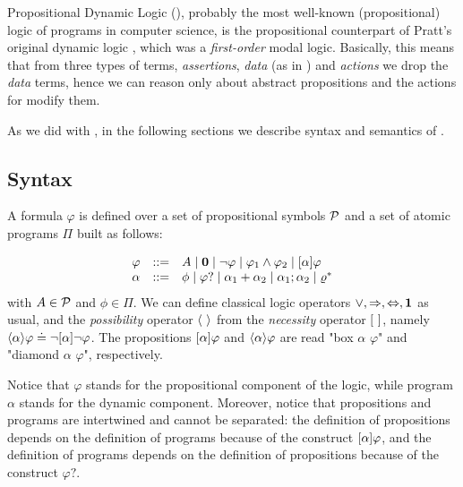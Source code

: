 Propositional Dynamic Logic \citep{FISCHER1979194} (\PDL), probably the most well-known (propositional) logic of programs in computer science, is the propositional counterpart of Pratt's original dynamic logic \citep{Pratt:1976:SCF:889769}, which was a \emph{first-order} modal logic. Basically, this means that from three types of terms, \emph{assertions}, \emph{data} (as in \FOL) and \emph{actions} we drop the \emph{data} terms, hence we can reason only about abstract propositions and the actions for modify them.
 
As we did with \LTL, in the following sections we describe syntax and semantics of \PDL.
\subsection{Syntax}\label{pdl-syntax}
A \PDL formula $\varphi$ is defined over a set of propositional symbols $\mathcal{P}$ and a set of atomic programs $\Pi$ built as follows:

\[\begin{array}{lcl}
\varphi &::=& A \mid \mathbf{0}  \mid \lnot \varphi \mid \varphi_1 \land \varphi_2 \mid [\alpha]\varphi \\
\alpha &::=& \phi \mid \varphi? \mid  \alpha_1 + \alpha_2 \mid \alpha_1; \alpha_2 \mid \varrho^*
\end{array}
\]
with $A\in \mathcal{P}$ and $\phi \in \Pi$.
We can define classical logic operators $\vee, \Rightarrow, \Leftrightarrow, \mathbf{1}$ as usual, and the \emph{possibility} operator $\DIAM{\ }$ from the \emph{necessity} operator $[\ ]$, namely $\langle \alpha \rangle\varphi \doteq \lnot [\alpha]\lnot \varphi$. The propositions $[\alpha]\varphi$ and $\langle \alpha \rangle\varphi$ are read "box $\alpha$ $\varphi$" and "diamond $\alpha$ $\varphi$", respectively. 

Notice that $\varphi$ stands for the propositional component of the logic, while program $\alpha$ stands for the dynamic component. Moreover, notice that propositions and programs are intertwined and cannot be separated: the definition of propositions depends on the definition of programs because of the construct $[\alpha]\varphi$, and the definition of programs depends on the definition of propositions because of the construct $\varphi?$. 

